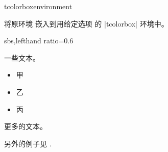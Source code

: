 \begin{docCommand}[doc new=2014-10-20]{tcolorboxenvironment}{}

将原环境 嵌入到用给定选项  的 |tcolorbox| 环境中。
\begin{dispExample*}{sbs,lefthand ratio=0.6}
\newenvironment{myitemize}{%
  \begin{itemize}}{\end{itemize}}


一些文本。
\begin{myitemize}
\item 甲
\item 乙
\item 丙
\end{myitemize}
更多的文本。
\end{dispExample*}

\medskip
另外的例子见 .
\end{docCommand}

